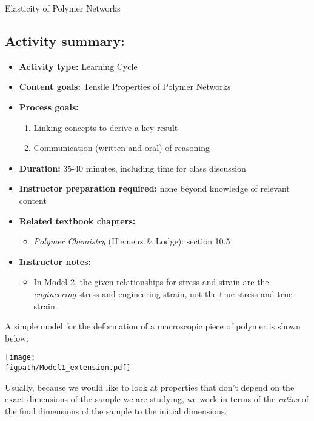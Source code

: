 \begin{activity}{Elasticity of Polymer Networks}
\begin{instructornotes}
	\subsection*{Activity summary:}
	\begin{itemize}
		\item \textbf{Activity type:} Learning Cycle
		\item \textbf{Content goals:} Tensile Properties of Polymer Networks
		\item \textbf{Process goals:} %
			\begin{enumerate}
				\item Linking concepts to derive a key result
				\item Communication (written and oral) of reasoning
			\end{enumerate}
		\item \textbf{Duration:} 35-40 minutes, including time for class discussion
		\item \textbf{Instructor preparation required:} none beyond knowledge of relevant content
		\item \textbf{Related textbook chapters:}
			\begin{itemize}
				\item \emph{Polymer Chemistry} (Hiemenz \& Lodge): section 10.5
			\end{itemize}
		\item \textbf{Instructor notes:}
			\begin{itemize}
				\item In Model 2, the given relationships for stress and strain are the \emph{engineering} stress and engineering strain, not the true stress and true strain.
			\end{itemize}
	\end{itemize}
	
\end{instructornotes}


\begin{model}
	\label{\labelbase:mdl:macrostretch}
	
	A simple model for the deformation of a macroscopic piece of polymer is shown below:
	
	\vspace{6pt}
	\centerline{\texttt{[image: \\figpath/Model1\_extension.pdf]}}
	
	Usually, because we would like to look at properties that don't depend on the exact dimensions of the sample we are studying, we work in terms of the \emph{ratios} of the final dimensions of the sample to the initial dimensions.
	

\end{model}
\end{activity}
